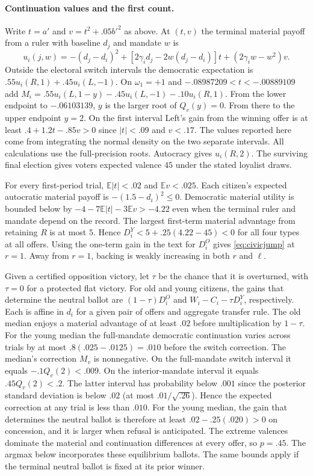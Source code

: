 \documentclass[11pt,letterpaper]{article}
\newcommand{\E}{\mathbb E}
\begin{document}
\paragraph{Continuation values and the first count.}
Write $t=a'$ and $v=t^2+.05b'^2$ as above. At $(t,v)$ the terminal material payoff from a ruler with baseline $d_j$ and mandate $w$ is
\[
 u_i(j,w)=-(d_j-d_i)^2+[2\gamma_i d_j-2w(d_j-d_i)]t+(2\gamma_iw-w^2)v .
\]
Outside the electoral switch intervals the democratic expectation is $.55u_i(R,1)+.45u_i(L,-1)$. On $\omega_1=+1$ and $-.08987209<t<-.00889109$ add $M_i=.55u_i(L,1-y)-.45u_i(L,-1)-.10u_i(R,1)$. From the lower endpoint to $-.06103139$, $y$ is the larger root of $Q_v(y)=0$. From there to the upper endpoint $y=2$. On the first interval Left's gain from the winning offer is at least $.4+1.2t-.85v>0$ since $|t|<.09$ and $v<.17$. The values reported here come from integrating the normal density on the two separate intervals. All calculations use the full-precision roots. Autocracy gives $u_i(R,2)$. The surviving final election gives voters expected valence $45$ under the stated loyalist draws.

For every first-period trial, $\E|t|<.02$ and $\E v<.025$. Each citizen's expected autocratic material payoff is $-(1.5-d_i)^2\le0$. Democratic material utility is bounded below by $-4-7\E|t|-3\E v> -4.22$ even when the terminal ruler and mandate depend on the record. The largest first-term material advantage from retaining $R$ is at most $5$. Hence $D_i^Y<5+.25(4.22-45)<0$ for all four types at all offers. Using the one-term gain in the text for $D_i^O$ gives \eqref{eq:civicjump} at $r=1$. Away from $r=1$, backing is weakly increasing in both $r$ and $\ell$.

Given a certified opposition victory, let $\tau$ be the chance that it is overturned, with $\tau=0$ for a protected flat victory. For old and young citizens, the gains that determine the neutral ballot are $(1-\tau)D_i^O$ and $W_i-C_i-\tau D_i^Y$, respectively. Each is affine in $d_i$ for a given pair of offers and aggregate transfer rule. The old median enjoys a material advantage of at least $.02$ before multiplication by $1-\tau$. For the young median the full-mandate democratic continuation varies across trials by at most $.8(.025-.0125)=.010$ before the switch correction. The median's correction $M_v$ is nonnegative. On the full-mandate switch interval it equals $-.1Q_v(2)<.009$. On the interior-mandate interval it equals $.45Q_v(2)<.2$. The latter interval has probability below $.001$ since the posterior standard deviation is below $.02$ (at most $.01/\sqrt{.26}$). Hence the expected correction at any trial is less than $.010$. For the young median, the gain that determines the neutral ballot is therefore at least $.02-.25(.020)>0$ on concession, and it is larger when refusal is anticipated. The extreme valences dominate the material and continuation differences at every offer, so $p=.45$. The argmax below incorporates these equilibrium ballots. The same bounds apply if the terminal neutral ballot is fixed at its prior winner.
\end{document}
